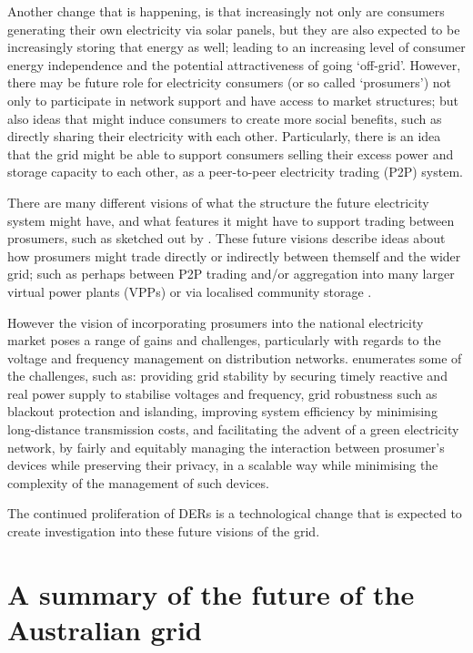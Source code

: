 Another change that is happening, is that increasingly not only are consumers generating their own electricity via solar panels, but they are also expected to be increasingly storing that energy as well; leading to an increasing level of consumer energy independence and the potential attractiveness of going `off-grid'.
However, there may be future role for electricity consumers (or so called `prosumers') not only to participate in network support and have access to market structures; but also ideas that might induce consumers to create more social benefits, such as directly sharing their electricity with each other.
Particularly, there is an idea that the grid might be able to support consumers selling their excess power and storage capacity to each other, as a peer-to-peer electricity trading (P2P) system.

There are many different visions of what the structure the future electricity system might have, and what features it might have to support trading between prosumers, such as sketched out by \cite{Parag2016}.
These future visions describe ideas about how prosumers might trade directly or indirectly between themself and the wider grid; such as perhaps between P2P trading and/or aggregation into many larger virtual power plants (VPPs) or via localised community storage \cite{Morstyn2018}.

However the vision of incorporating prosumers into the national electricity market poses a range of gains and challenges, particularly with regards to the voltage and frequency management on distribution networks.
\cite{BELL2018765} enumerates some of the challenges, such as: providing grid stability by securing timely reactive and real power supply to stabilise voltages and frequency, grid robustness such as blackout protection and islanding, improving system efficiency by minimising long-distance transmission costs, and facilitating the advent of a green electricity network, by fairly and equitably managing the interaction between prosumer's devices while preserving their privacy, in a scalable way while minimising the complexity of the management of such devices.

The continued proliferation of DERs is a technological change that is expected to create investigation into these future visions of the grid.

\section{A summary of the future of the Australian grid}

